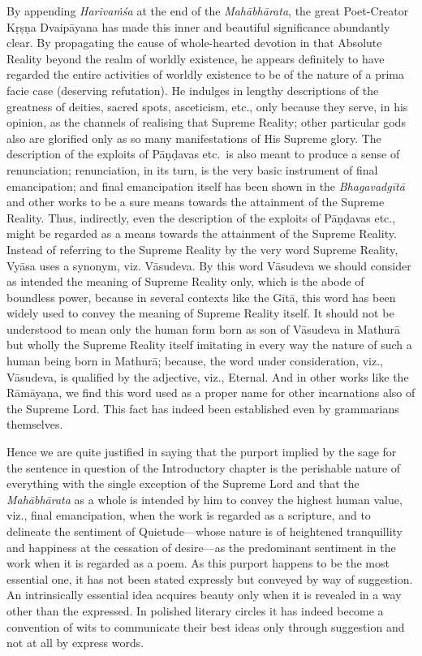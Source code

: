 \documentclass[12pt]{book}
\begin{document}
By appending \textit{Harivaṁśa} at the end of the \textit{Mahābhārata},
the great Poet-Creator Kṛṣṇa Dvaipāyana has made this inner
and beautiful significance abundantly clear. By propagating the
cause of whole-hearted devotion in that Absolute Reality beyond
the realm of worldly existence, he appears definitely to have
regarded the entire activities of worldly existence to be of the
nature of a prima facie case (deserving refutation). He indulges
in lengthy descriptions of the greatness of deities, sacred spots,
asceticism, etc., only because they serve, in his opinion, as the
channels of realising that Supreme Reality; other particular
gods also are glorified only as so many manifestations of His
Supreme glory. The description of the exploits of Pāṇḍavas
etc.\ is also meant to produce a sense of renunciation; renunciation, in its turn, is the very basic instrument of final emancipation; and final emancipation itself has been shown in the
\textit{Bhagavadgītā} and other works to be a sure means towards
the attainment of the Supreme Reality. Thus, indirectly, even the
description of the exploits of Pāṇḍavas etc., might be regarded
as a means towards the attainment of the Supreme Reality.
Instead of referring to the Supreme Reality by the very word
Supreme Reality, Vyāsa uses a synonym, viz. Vāsudeva. By this
word Vāsudeva we should consider as intended the meaning of
Supreme Reality only, which is the abode of boundless power,
because in several contexts like the Gītā, this word has been
widely used to convey the meaning of Supreme Reality itself.
It should not be understood to mean only the human form born
as son of Vāsudeva in Mathurā but wholly the Supreme Reality
itself imitating in every way the nature of such a human being
born in Mathurā; because, the word under consideration, viz.,
Vāsudeva, is qualified by the adjective, viz., Eternal. And in
other works like the Rāmāyaṇa, we find this word used as a
proper name for other incarnations also of the Supreme Lord.
This fact has indeed been established even by grammarians
themselves.

Hence we are quite justified in saying that the purport
implied by the sage for the sentence in question of the Introductory
chapter is the perishable nature of everything with the single
exception of the Supreme Lord and that the \textit{Mahābhārata} as
a whole is intended by him to convey the highest human value,
viz., final emancipation, when the work is regarded as a scripture,
and to delineate the sentiment of Quietude---whose nature is of
heightened tranquillity and happiness at the cessation of desire---as
the predominant sentiment in the work when it is regarded as
a poem. As this purport happens to be the most essential one,
it has not been stated expressly but conveyed by way of suggestion.
An intrinsically essential idea acquires beauty only when it is
revealed in a way other than the expressed. In polished literary
circles it has indeed become a convention of wits to communicate
their best ideas only through suggestion and not at all by express
words.
\end{document}
